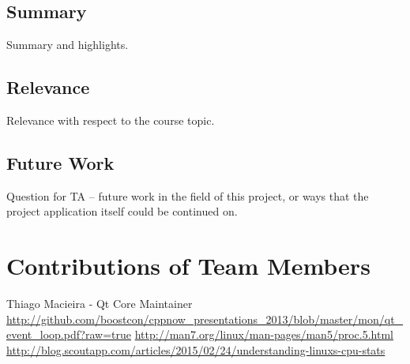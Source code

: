 \documentclass[12pt]{article}
\begin{document}
	\subsection{Summary}
	Summary and highlights.
	
	\subsection{Relevance}
	Relevance with respect to the course topic.
	
	\subsection{Future Work}
	Question for TA -- future work in the field of this project, or ways that the project application itself could be continued on.
	
	
	\setcounter{secnumdepth}{0}
	\section{Contributions of Team Members}
	
	\begin{thebibliography}{3}
	 Thiago Macieira - Qt Core Maintainer \url{http://github.com/boostcon/cppnow_presentations_2013/blob/master/mon/qt_event_loop.pdf?raw=true}
	\url{http://man7.org/linux/man-pages/man5/proc.5.html}
	\url{http://blog.scoutapp.com/articles/2015/02/24/understanding-linuxs-cpu-stats}
	\end{thebibliography}{}
\end{document}
